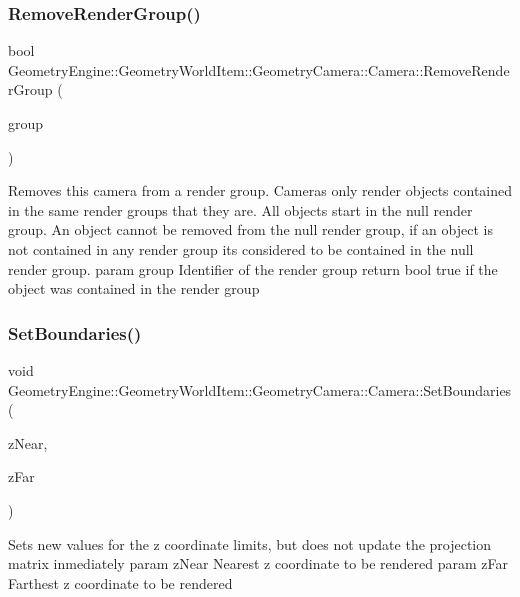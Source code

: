 \subsubsection{\texorpdfstring{RemoveRenderGroup()}{RemoveRenderGroup()}}
{\footnotesize\ttfamily bool Geometry\+Engine\+::\+Geometry\+World\+Item\+::\+Geometry\+Camera\+::\+Camera\+::\+Remove\+Render\+Group (\begin{DoxyParamCaption}\item[{int}]{group }\end{DoxyParamCaption})\hspace{0.3cm}{\ttfamily [virtual]}}

Removes this camera from a render group. Cameras only render objects contained in the same render groups that they are. All objects start in the null render group. An object cannot be removed from the null render group, if an object is not contained in any render group it\textquotesingle{}s considered to be contained in the null render group. param group Identifier of the render group return bool true if the object was contained in the render group \mbox{\label{class_geometry_engine_1_1_geometry_world_item_1_1_geometry_camera_1_1_camera_acf991463c9975a3b0dd047bb73a7dc95}} 
\subsubsection{\texorpdfstring{SetBoundaries()}{SetBoundaries()}}
{\footnotesize\ttfamily void Geometry\+Engine\+::\+Geometry\+World\+Item\+::\+Geometry\+Camera\+::\+Camera\+::\+Set\+Boundaries (\begin{DoxyParamCaption}\item[{G\+Ldouble}]{z\+Near,  }\item[{G\+Ldouble}]{z\+Far }\end{DoxyParamCaption})\hspace{0.3cm}{\ttfamily [inline]}}

Sets new values for the z coordinate limits, but does not update the projection matrix inmediately param z\+Near Nearest z coordinate to be rendered param z\+Far Farthest z coordinate to be rendered \mbox{\label{class_geometry_engine_1_1_geometry_world_item_1_1_geometry_camera_1_1_camera_aabac97d1334ff271308102e53735d042}} 
